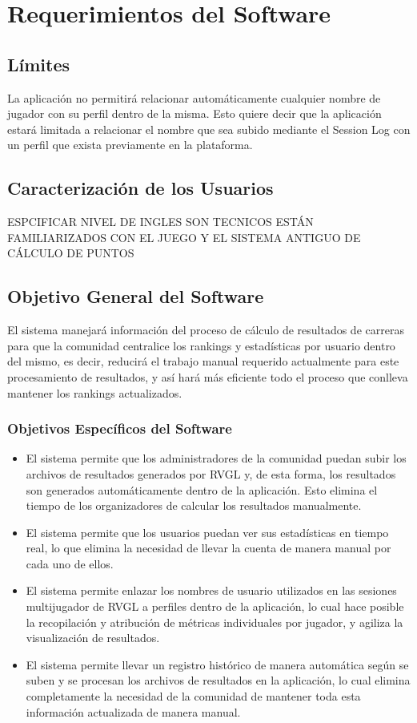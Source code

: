 \chapter{Requerimientos del Software}

\section{Límites}
La aplicación no permitirá relacionar automáticamente cualquier nombre de jugador con su perfil dentro de la misma. Esto quiere decir que la aplicación estará limitada a relacionar el nombre que sea subido mediante el Session Log con un perfil que exista previamente en la plataforma.

\section{Caracterización de los Usuarios}

ESPCIFICAR NIVEL DE INGLES
SON TECNICOS
ESTÁN FAMILIARIZADOS CON EL JUEGO Y EL SISTEMA ANTIGUO DE CÁLCULO DE PUNTOS

\section{Objetivo General del Software}
El sistema manejará información del proceso de cálculo de resultados de carreras para que la comunidad centralice los rankings y estadísticas por usuario dentro del mismo, es decir, reducirá el trabajo manual requerido actualmente para este procesamiento de resultados, y así hará más eficiente todo el proceso que conlleva mantener los rankings actualizados.


\subsection{Objetivos Específicos del Software}
\begin{itemize}
	\item El sistema permite que los administradores de la comunidad puedan subir los archivos de resultados generados por RVGL y, de esta forma, los resultados son generados automáticamente dentro de la aplicación. Esto elimina el tiempo de los organizadores de calcular los resultados manualmente.
	\item El sistema permite que los usuarios puedan ver sus estadísticas en tiempo real, lo que elimina la necesidad de llevar la cuenta de manera manual por cada uno de ellos.
	\item El sistema permite enlazar los nombres de usuario utilizados en las sesiones multijugador de RVGL a perfiles dentro de la aplicación, lo cual hace posible la recopilación y atribución de métricas individuales por jugador, y agiliza la visualización de resultados.
	\item El sistema permite llevar un registro histórico de manera automática según se suben y se procesan los archivos de resultados en la aplicación, lo cual elimina completamente la necesidad de la comunidad de mantener toda esta información actualizada de manera manual.
\end{itemize}

